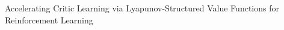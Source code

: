\documentclass[]{article}
\begin{document}
Accelerating Critic Learning via Lyapunov-Structured Value Functions for Reinforcement Learning
\end{document}
